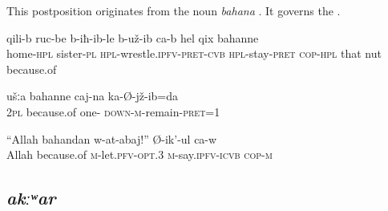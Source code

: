 This postposition originates from the noun \textit{bahana} . It governs the .
%
\begin{exe}
	\ex
	\begin{xlist}
		\ex	\label{At home the sisters were apparently arguing because of the nut}
		\gll	qili-b	ruc-be	b-iħ-ib-le	b-už-ib ca-b	hel	qix	bahanne  \\
			home-\textsc{hpl}	sister-\textsc{pl}	\textsc{hpl}-wrestle.\textsc{ipfv}-\textsc{pret}-\textsc{cvb}	\textsc{hpl}-stay-\textsc{pret} \textsc{cop-hpl}	that	nut	because.of\\
		\glt	{}

		\ex	\label{Because of you I sat in prison once}
		\gll	ušːa	bahanne	caj-na	ka-Ø-jž-ib=da  \\
			2\textsc{pl}	because.of	one-	\textsc{down-m}-remain-\textsc{pret}=1\\
		\glt	{}

		\ex	\label{For God’s sake, let me, he says}
		\gll	``Allah	bahandan	w-at-abaj!''	Ø-ik'-ul	ca-w  \\
			Allah	because.of	\textsc{m}-let.\textsc{pfv}-\textsc{opt}.3	\textsc{m}-say.\textsc{ipfv}-\textsc{icvb}	\textsc{cop-m}\\
		\glt	{}
	\end{xlist}
\end{exe}



\subsection{\textit{akːʷar} }
\label{ssec:postposition akwar}

